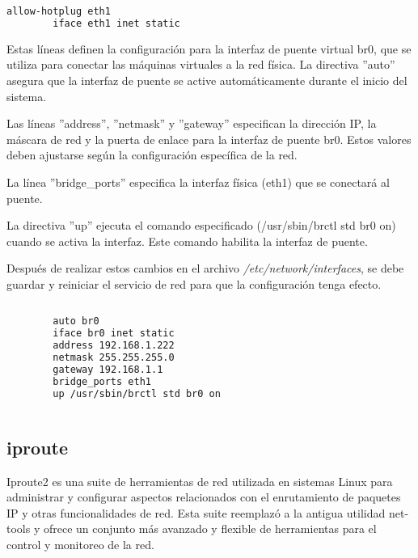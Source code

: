 		\begin{lstlisting}[language=Bash, caption=interfaz]	
		allow-hotplug eth1
		iface eth1 inet static
	    \end{lstlisting}

		Estas líneas definen la configuración para la interfaz de puente virtual br0, que se utiliza para conectar las máquinas virtuales a la red física. La directiva ''auto'' asegura que la interfaz de puente se active automáticamente durante el inicio del sistema.\par

		Las líneas ''address'', ''netmask'' y ''gateway'' especifican la dirección IP, la máscara de red y la puerta de enlace para la interfaz de puente br0. Estos valores deben ajustarse según la configuración específica de la red.\par
		
		La línea ''bridge\_ports'' especifica la interfaz física (eth1) que se conectará al puente.\par
		
		La directiva ''up'' ejecuta el comando especificado (/usr/sbin/brctl std br0 on) cuando se activa la interfaz. Este comando habilita la interfaz de puente.\par
		
		Después de realizar estos cambios en el archivo \textit{/etc/network/interfaces}, se debe guardar y reiniciar el servicio de red para que la configuración tenga efecto.\par
		
		\begin{lstlisting}[language=Bash, caption=interfaz]
		
		auto br0
		iface br0 inet static
		address 192.168.1.222
		netmask 255.255.255.0
		gateway 192.168.1.1
		bridge_ports eth1
		up /usr/sbin/brctl std br0 on
		
		\end{lstlisting}

		\subsection{iproute}
		
		Iproute2 es una suite de herramientas de red utilizada en sistemas Linux para administrar y configurar aspectos relacionados con el enrutamiento de paquetes IP y otras funcionalidades de red. Esta suite reemplazó a la antigua utilidad net-tools y ofrece un conjunto más avanzado y flexible de herramientas para el control y monitoreo de la red.\par
		
